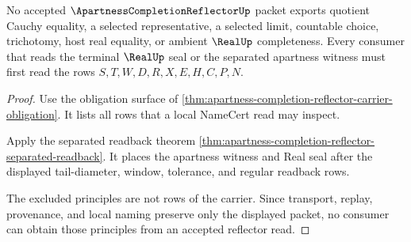 \begin{theorem}
\label{thm:apartness-completion-reflector-nonescape}
No accepted $\ApartnessCompletionReflectorUp$ packet exports quotient Cauchy equality, a selected representative, a selected limit, countable choice, trichotomy, host real equality, or ambient $\RealUp$ completeness. Every consumer that reads the terminal $\RealUp$ seal or the separated apartness witness must first read the rows $S,T,W,D,R,X,E,H,C,P,N$.
\end{theorem}
\begin{proof}
Use the obligation surface of \autoref{thm:apartness-completion-reflector-carrier-obligation}. It lists all rows that a local NameCert read may inspect.

Apply the separated readback theorem \autoref{thm:apartness-completion-reflector-separated-readback}. It places the apartness witness and Real seal after the displayed tail-diameter, window, tolerance, and regular readback rows.

The excluded principles are not rows of the carrier. Since transport, replay, provenance, and local naming preserve only the displayed packet, no consumer can obtain those principles from an accepted reflector read.
\end{proof}




